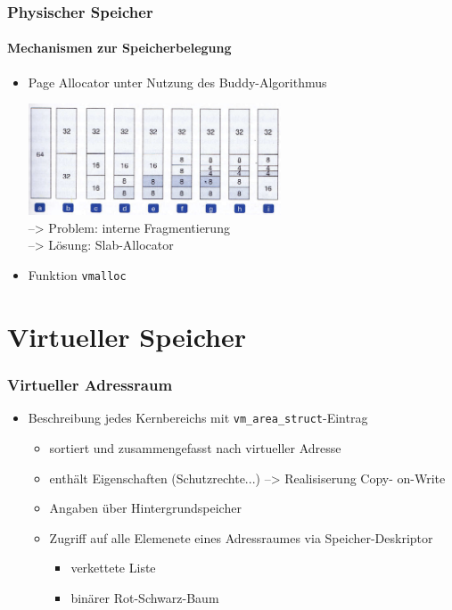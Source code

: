 \documentclass[ddcfooter,nosectionnum]{tudbeamer}
\begin{document}
\begin{frame}
\frametitle{Physischer Speicher}
\framesubtitle{Mechanismen zur Speicherbelegung}
	\begin{itemize}
		\item Page Allocator unter Nutzung des Buddy-Algorithmus
	
	
		\includegraphics[width=7.5cm]{buddy.png}\\
		--> Problem: interne Fragmentierung\\
		--> Lösung:  Slab-Allocator 
		\item Funktion \texttt{vmalloc}
	
	\end{itemize}
	
\end{frame}	





\section{Virtueller Speicher}
\begin{frame}
    \frametitle{Virtueller Adressraum}
    \begin{itemize}
    	    \item Beschreibung jedes Kernbereichs mit \texttt{vm\_area\_struct}-Eintrag 
   		\begin{itemize}
			 \item sortiert und zusammengefasst nach virtueller Adresse\\
			\item enthält Eigenschaften (Schutzrechte...)
			--> Realisiserung Copy- on-Write
			\item Angaben über Hintergrundspeicher
    			\item Zugriff auf alle Elemenete eines Adressraumes via Speicher-Deskriptor
			\begin{itemize}
				\item verkettete Liste
				\item binärer Rot-Schwarz-Baum
			\end{itemize}
   		\end{itemize} 
	\end{itemize}
    
\end{frame}
\end{document}
